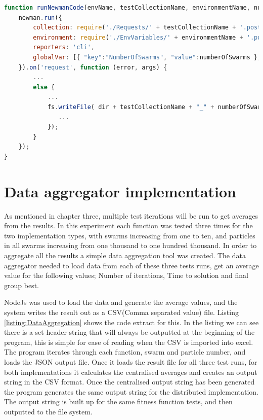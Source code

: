 \documentclass[oneside,12pt]{book}
\begin{document}
\begin{lstlisting}[basicstyle=\footnotesize, language=JavaScript]
function runNewmanCode(envName, testCollectionName, environmentName, numberOfSwarms, numberOfParticles, baseUrlsSting, endpoint) {
    newman.run({
        collection: require('./Requests/' + testCollectionName + '.postman_collection.json'),
        environment: require('./EnvVariables/' + environmentName + '.postman_environment.json'),
        reporters: 'cli',
        globalVar: [{ "key":"NumberOfSwarms", "value":numberOfSwarms }, {"key":"endpoint", "value": endpoint}, { "key":"NumberOfParticles", "value": numberOfParticles}, { "key":"BaseUrls", "value": baseUrlsSting}]
    }).on('request', function (error, args) {
        ...
        else {
            ...
            fs.writeFile( dir + testCollectionName + "_" + numberOfSwarms + "_" + numberOfParticles + '.result.json', args.response.stream, function (error) {
               ...
            });
        }
    });
}
\end{lstlisting}
\label{listing:NewmanImpl}

\section{Data aggregator implementation}
As mentioned in chapter three, multiple test iterations will be run to get averages from the results. In this experiment each function was tested three times for the two implementation types, with swarms increasing from one to ten, and particles in all swarms increasing from one thousand to one hundred thousand. In order to aggregate all the results a simple data aggregation tool was created. The data aggregator needed to load data from each of these three tests runs, get an average value for the following values; Number of iterations, Time to solution and final group best. 

NodeJs was used to load the data and generate the average values, and the system writes the result out as a CSV(Comma separated value) file. Listing \ref{listing:DataAggregation} shows the code extract for this. In the listing we can see there is a set header string that will always be outputted at the beginning of the program, this is simple for ease of reading when the CSV is imported into excel. The program iterates through each function, swarm and particle number, and loads the JSON output file. Once it loads the result file for all three test runs, for both implementations it calculates the centralised averages and creates an output string in the CSV format. Once the centralised output string has been generated the program generates the same output string for the distributed implementation. The output string is built up for the same fitness function tests, and then outputted to the file system. 
\end{document}
